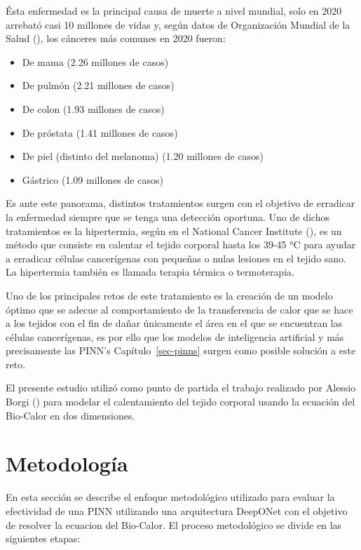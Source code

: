 \documentclass[
  spanish,
  us-letterpaper,
]{scrreprt}
\providecommand{\tightlist}{%
  \setlength{\itemsep}{0pt}\setlength{\parskip}{0pt}}
\theoremstyle{definition}
\theoremstyle{plain}
\theoremstyle{remark}
\begin{document}
Ésta enfermedad es la principal causa de muerte a nivel mundial, solo en
2020 arrebató casi 10 millones de vidas y, según datos de Organización
Mundial de la Salud (), los cánceres más
comunes en 2020 fueron:

\begin{itemize}
\tightlist
\item
  De mama (2.26 millones de casos)
\item
  De pulmón (2.21 millones de casos)
\item
  De colon (1.93 millones de casos)
\item
  De próstata (1.41 millones de casos)
\item
  De piel (distinto del melanoma) (1.20 millones de casos)
\item
  Gástrico (1.09 millones de casos)
\end{itemize}

Es ante este panorama, distintos tratamientos surgen con el objetivo de
erradicar la enfermedad siempre que se tenga una detección oportuna. Uno
de dichos tratamientos es la hipertermia, según en el National Cancer
Institute (), es un método que consiste
en calentar el tejido corporal hasta los 39-45 °C para ayudar a
erradicar células cancerígenas con pequeñas o nulas lesiones en el
tejido sano. La hipertermia también es llamada terapia térmica o
termoterapia.

Uno de los principales retos de este tratamiento es la creación de un
modelo óptimo que se adecue al comportamiento de la transferencia de
calor que se hace a los tejidos con el fin de dañar únicamente el área
en el que se encuentran las células cancerígenas, es por ello que los
modelos de inteligencia artificial y más precisamente las PINN's
Capítulo~\ref{sec-pinns} surgen como posible solución a este reto.

El presente estudio utilizó como punto de partida el trabajo realizado
por Alessio Borgi () para modelar el
calentamiento del tejido corporal usando la ecuación del Bio-Calor en
dos dimensiones.

\chapter{Metodología}\label{metodologuxeda}

En esta sección se describe el enfoque metodológico utilizado para
evaluar la efectividad de una PINN utilizando una arquitectura DeepONet
con el objetivo de resolver la ecuacion del Bio-Calor. El proceso
metodológico se divide en las siguientes etapas:
\end{document}

